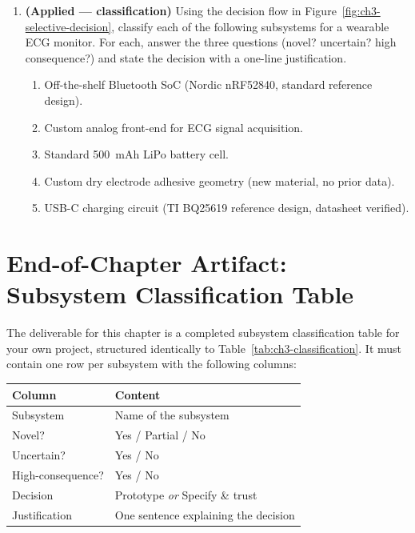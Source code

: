 \begin{enumerate}
  \item \textbf{(Applied --- classification)} Using the decision flow in
  Figure~\ref{fig:ch3-selective-decision}, classify each of the following
  subsystems for a wearable ECG monitor. For each, answer the three questions
  (novel? uncertain? high consequence?) and state the decision with a one-line
  justification.
  \begin{enumerate}
    \item Off-the-shelf Bluetooth SoC (Nordic nRF52840, standard reference design).
    \item Custom analog front-end for ECG signal acquisition.
    \item Standard 500~mAh LiPo battery cell.
    \item Custom dry electrode adhesive geometry (new material, no prior data).
    \item USB-C charging circuit (TI BQ25619 reference design, datasheet verified).
  \end{enumerate}

\end{enumerate}

\section*{End-of-Chapter Artifact: Subsystem Classification Table}
\label{sec:ch3-artifact}

The deliverable for this chapter is a completed subsystem classification table
for your own project, structured identically to
Table~\ref{tab:ch3-classification}.
It must contain one row per subsystem with the following columns:

\begin{center}
\begin{tabular}{lp{7cm}}
\toprule
Column & Content \\
\midrule
Subsystem & Name of the subsystem \\
Novel? & Yes / Partial / No \\
Uncertain? & Yes / No \\
High-consequence? & Yes / No \\
Decision & Prototype \emph{or} Specify \& trust \\
Justification & One sentence explaining the decision \\
\bottomrule
\end{tabular}
\end{center}

